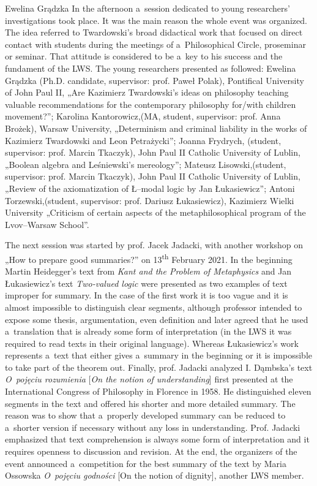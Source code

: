 \begin{editorialeng}{Ewelina Grądzka}
In the afternoon a~session dedicated to young researchers’ investigations took place. It was the main reason the whole event was organized. The idea referred to Twardowski’s broad didactical work that focused on direct contact with students during the meetings of a~Philosophical Circle, proseminar or seminar. That attitude is considered to be a~key to his success and the fundament of the LWS. The young researchers presented as followed: Ewelina Grądzka (Ph.D. candidate, supervisor: prof. Paweł Polak), Pontifical University of John Paul II, „Are Kazimierz Twardowski’s ideas on philosophy teaching valuable recommendations for the contemporary philosophy for/with children movement?”; Karolina Kantorowicz,(MA, student, supervisor: prof. Anna Brożek), Warsaw University, „Determinism and criminal liability in the works of Kazimierz Twardowski and Leon Petrażycki”; Joanna Frydrych, (student, supervisor: prof. Marcin Tkaczyk), John Paul II Catholic University of Lublin, „Boolean algebra and Leśniewski’s mereology”; Mateusz Lisowski,(student, supervisor: prof. Marcin Tkaczyk), John Paul II Catholic University of Lublin, „Review of the axiomatization of Ł--modal logic by Jan Łukasiewicz”; Antoni Torzewski,(student, supervisor: prof. Dariusz Łukasiewicz), Kazimierz Wielki University „Criticism of certain aspects of the metaphilosophical program of the Lvov--Warsaw School”.

The next session was started by prof. Jacek Jadacki, with another workshop on „How to prepare good summaries?” on 13\textsuperscript{th} February 2021. In the beginning Martin Heidegger’s text from \textit{Kant and the Problem of Metaphysics} and Jan Łukasiewicz’s text \textit{Two-valued logic} were presented as two examples of text improper for summary. In the case of the first work it is too vague and it is almost impossible to distinguish clear segments, although professor intended to expose some thesis, argumentation, even definition and later agreed that he used a~translation that is already some form of interpretation (in the LWS it was required to read texts in their original language). Whereas Łukasiewicz’s work represents a~text that either gives a~summary in the beginning or it is impossible to take part of the theorem out. Finally, prof. Jadacki analyzed I. Dąmbska’s text \textit{O~pojęciu rozumienia} [\textit{On the notion of understanding}]
\parencite[][]{dambska_notion_2016} %
 first presented at the International Congress of Philosophy in Florence in 1958. He distinguished eleven segments in the text and offered his shorter and more detailed summary. The reason was to show that a~properly developed summary can be reduced to a~shorter version if necessary without any loss in understanding. Prof. Jadacki emphasized that text comprehension is always some form of interpretation and it requires openness to discussion and revision. At the end, the organizers of the event announced a~competition for the best summary of the text by Maria Ossowska \textit{O~pojęciu godności} [On the notion of dignity], another LWS member.


\end{editorialeng}
